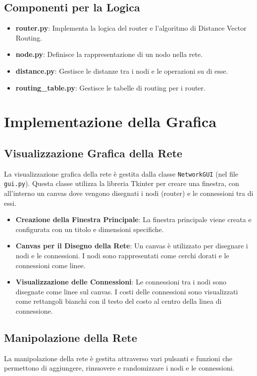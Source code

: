 \documentclass[a4paper,12pt]{report}
\begin{document}
\subsection{Componenti per la Logica}
\begin{itemize}
    \item \textbf{router.py}: Implementa la logica del router e l'algoritmo di Distance Vector Routing.
    \item \textbf{node.py}: Definisce la rappresentazione di un nodo nella rete.
    \item \textbf{distance.py}: Gestisce le distanze tra i nodi e le operazioni su di esse.
    \item \textbf{routing\_table.py}: Gestisce le tabelle di routing per i router.
\end{itemize}

\newpage
\section{Implementazione della Grafica}
\subsection{Visualizzazione Grafica della Rete}
La visualizzazione grafica della rete è gestita dalla classe \texttt{NetworkGUI} (nel file \texttt{gui.py}). Questa classe utilizza la libreria Tkinter per creare una finestra, con all'interno un canvas dove vengono disegnati i nodi (router) e le connessioni tra di essi.

\begin{itemize}
    \item \textbf{Creazione della Finestra Principale}: La finestra principale viene creata e configurata con un titolo e dimensioni specifiche.
    \item \textbf{Canvas per il Disegno della Rete}: Un canvas è utilizzato per disegnare i nodi e le connessioni. I nodi sono rappresentati come cerchi dorati e le connessioni come linee.
    \item \textbf{Visualizzazione delle Connessioni}: Le connessioni tra i nodi sono disegnate come linee sul canvas. I costi delle connessioni sono visualizzati come rettangoli bianchi con il testo del costo al centro della linea di connessione.
\end{itemize}

\subsection{Manipolazione della Rete}
La manipolazione della rete è gestita attraverso vari pulsanti e funzioni che permettono di aggiungere, rimuovere e randomizzare i nodi e le connessioni.
\end{document}
